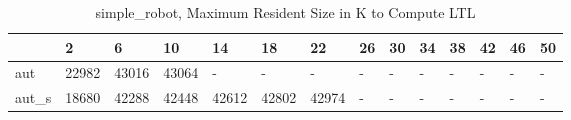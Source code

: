 \begin{table}
\caption{simple_robot, Maximum Resident Size in K to Compute LTL}
\label{simple_robot_LTL_size}
\begin{tabular}{llllllllllllll}
\toprule
 & 2 & 6 & 10 & 14 & 18 & 22 & 26 & 30 & 34 & 38 & 42 & 46 & 50 \\
\midrule
aut & 22982 & 43016 & 43064 & - & - & - & - & - & - & - & - & - & - \\
aut_s & 18680 & 42288 & 42448 & 42612 & 42802 & 42974 & - & - & - & - & - & - & - \\
\bottomrule
\end{tabular}
\end{table}
